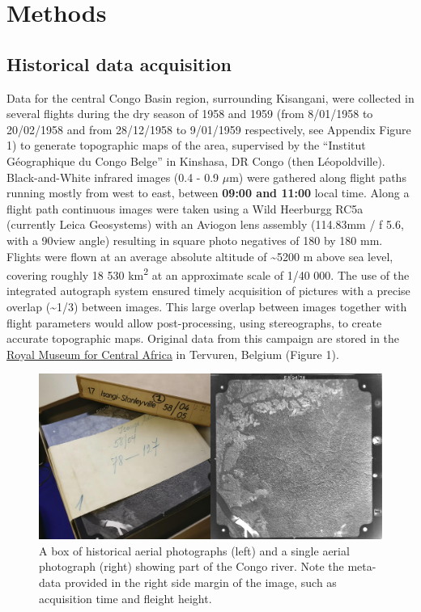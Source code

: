 \documentclass[remote sensing,article,submit,moreauthors,pdftex]{mdpi}
\begin{document}
\hypertarget{methods}{%
\section{Methods}\label{methods}}

\hypertarget{historical-data-acquisition}{%
\subsection{Historical data
acquisition}\label{historical-data-acquisition}}

Data for the central Congo Basin region, surrounding Kisangani, were
collected in several flights during the dry season of 1958 and 1959
(from 8/01/1958 to 20/02/1958 and from 28/12/1958 to 9/01/1959
respectively, see Appendix Figure 1) to generate topographic maps of the
area, supervised by the ``Institut Géographique du Congo Belge'' in
Kinshasa, DR Congo (then Léopoldville). Black-and-White infrared images
(0.4 - 0.9 \(\mu\)m) were gathered along flight paths running mostly
from west to east, between \textbf{09:00 and 11:00} local time. Along a
flight path continuous images were taken using a Wild Heerburgg RC5a
(currently Leica Geosystems) with an Aviogon lens assembly (114.83mm / f
5.6, with a 90\degree view angle) resulting in square photo negatives of
180 by 180 mm. Flights were flown at an average absolute altitude of
\textasciitilde{}5200 m above sea level, covering roughly 18 530
km\textsuperscript{2} at an approximate scale of 1/40 000. The use of
the integrated autograph system ensured timely acquisition of pictures
with a precise overlap (\textasciitilde{}1/3) between images. This large
overlap between images together with flight parameters would allow
post-processing, using stereographs, to create accurate topographic
maps. Original data from this campaign are stored in the
\href{https://www.africamuseum.be/en}{Royal Museum for Central Africa}
in Tervuren, Belgium (Figure 1).

\begin{figure}

{\centering \includegraphics[width=0.75\linewidth]{./figures/print_examples} 

}

\caption{A box of historical aerial photographs (left) and a single aerial photograph (right) showing part of the Congo river. Note the meta-data provided in the right side margin of the image, such as acquisition time and fleight height.}\label{fig:unnamed-chunk-1}
\end{figure}
\end{document}
